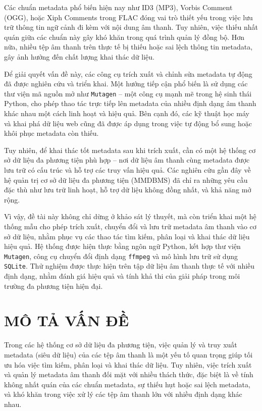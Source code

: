 \documentclass[conference]{IEEEtran}
\begin{document}
Các chuẩn metadata phổ biến hiện nay như ID3 (MP3), 
Vorbis Comment (OGG), hoặc Xiph Comments trong FLAC đóng vai trò thiết yếu 
trong việc lưu trữ thông tin ngữ cảnh đi kèm với nội dung âm thanh. 
Tuy nhiên, việc thiếu nhất quán giữa các chuẩn này gây khó khăn trong quá trình quản lý đồng bộ. 
Hơn nữa, nhiều tệp âm thanh trên thực tế bị thiếu hoặc sai lệch thông tin metadata, gây ảnh hưởng đến chất lượng khai thác dữ liệu.

Để giải quyết vấn đề này, các công cụ trích xuất và chỉnh sửa metadata tự động đã được nghiên cứu và triển khai. 
Một hướng tiếp cận phổ biến là sử dụng các thư viện mã nguồn mở như \texttt{Mutagen} – 
một công cụ mạnh mẽ trong hệ sinh thái Python, cho phép thao tác trực tiếp lên metadata 
của nhiều định dạng âm thanh khác nhau một cách linh hoạt và hiệu quả. Bên cạnh đó, 
các kỹ thuật học máy và khai phá dữ liệu web cũng đã được áp dụng trong việc tự động bổ sung hoặc khôi phục metadata còn thiếu.

Tuy nhiên, để khai thác tốt metadata sau khi trích xuất, cần có một hệ thống cơ sở dữ liệu đa phương tiện phù hợp 
– nơi dữ liệu âm thanh cùng metadata được lưu trữ có cấu trúc và hỗ trợ các truy vấn hiệu quả. 
Các nghiên cứu gần đây về hệ quản trị cơ sở dữ liệu đa phương tiện (MMDBMS) 
đã chỉ ra những yêu cầu đặc thù như lưu trữ linh hoạt, hỗ trợ dữ liệu không đồng nhất, và khả năng mở rộng.

Vì vậy, đề tài này không chỉ dừng ở khảo sát lý thuyết, mà còn triển khai một hệ thống mẫu cho phép trích xuất, 
chuyển đổi và lưu trữ metadata âm thanh vào cơ sở dữ liệu, nhằm phục vụ các thao tác tìm kiếm, 
phân loại và khai thác dữ liệu hiệu quả. Hệ thống được hiện thực bằng ngôn ngữ Python, 
kết hợp thư viện \texttt{Mutagen}, công cụ chuyển đổi định dạng \texttt{ffmpeg} và mô hình lưu trữ sử dụng \texttt{SQLite}. 
Thử nghiệm được thực hiện trên tập dữ liệu âm thanh thực tế với nhiều định dạng, 
nhằm đánh giá hiệu quả và tính khả thi của giải pháp trong môi trường đa phương tiện hiện đại.

\section{MÔ TẢ VẤN ĐỀ}
Trong các hệ thống cơ sở dữ liệu đa phương tiện, việc quản lý và truy xuất metadata (siêu dữ liệu) của các tệp âm thanh là một yếu tố quan trọng giúp tối ưu hóa việc tìm kiếm, phân loại và khai thác dữ liệu. Tuy nhiên, việc trích xuất và quản lý metadata âm thanh đối mặt với nhiều thách thức, đặc biệt là về tính không nhất quán của các chuẩn metadata, sự thiếu hụt hoặc sai lệch metadata, và khó khăn trong việc xử lý các tệp âm thanh lớn với nhiều định dạng khác nhau.
\end{document}
